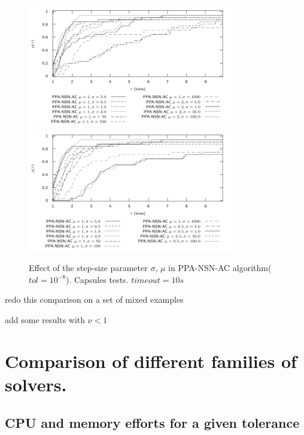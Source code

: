 \begin{figure}
  \centering
  \includegraphics[width=0.8\textwidth]{../figure/profile-Capsules-reduced-PPA-NSN-AC-1_10-time.pdf}
  \includegraphics[width=0.8\textwidth]{../figure/profile-Capsules-reduced-PPA-NSN-AC-1_10-time-bis.pdf}
   \caption{Effect of the step-size parameter $\sigma$, $\mu$ in PPA-NSN-AC algorithm( $tol = 10^{-8}$). Capsules tests. $timeout=10s$}
  \label{fig:profile-Capsules-reduced-PPA-NSN-AC-1_10-time}
\end{figure}
\begin{ndrva}
  \item redo this comparison on a set of mixed examples 
  \item add some results with $\nu < 1 $
\end{ndrva}


\section{Comparison of different families of solvers.}


\subsection{CPU and memory efforts for a given tolerance}

